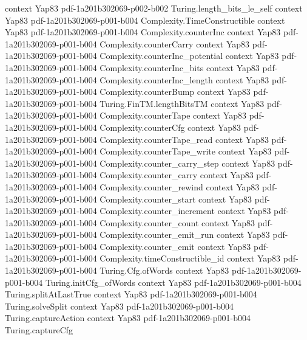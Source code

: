\begin{theorem}
  {context}
  {Yap83}
  {pdf-1a201b302069-p002-b002}
\proofstep
  {Turing.length_bits_le_self}
  {context}
  {Yap83}
  {pdf-1a201b302069-p001-b004}
\proofstep
  {Complexity.TimeConstructible}
  {context}
  {Yap83}
  {pdf-1a201b302069-p001-b004}
\proofstep
  {Complexity.counterInc}
  {context}
  {Yap83}
  {pdf-1a201b302069-p001-b004}
\proofstep
  {Complexity.counterCarry}
  {context}
  {Yap83}
  {pdf-1a201b302069-p001-b004}
\proofstep
  {Complexity.counterInc_potential}
  {context}
  {Yap83}
  {pdf-1a201b302069-p001-b004}
\proofstep
  {Complexity.counterInc_bits}
  {context}
  {Yap83}
  {pdf-1a201b302069-p001-b004}
\proofstep
  {Complexity.counterInc_length}
  {context}
  {Yap83}
  {pdf-1a201b302069-p001-b004}
\proofstep
  {Complexity.counterBump}
  {context}
  {Yap83}
  {pdf-1a201b302069-p001-b004}
\proofstep
  {Turing.FinTM.lengthBitsTM}
  {context}
  {Yap83}
  {pdf-1a201b302069-p001-b004}
\proofstep
  {Complexity.counterTape}
  {context}
  {Yap83}
  {pdf-1a201b302069-p001-b004}
\proofstep
  {Complexity.counterCfg}
  {context}
  {Yap83}
  {pdf-1a201b302069-p001-b004}
\proofstep
  {Complexity.counterTape_read}
  {context}
  {Yap83}
  {pdf-1a201b302069-p001-b004}
\proofstep
  {Complexity.counterTape_write}
  {context}
  {Yap83}
  {pdf-1a201b302069-p001-b004}
\proofstep
  {Complexity.counter_carry_step}
  {context}
  {Yap83}
  {pdf-1a201b302069-p001-b004}
\proofstep
  {Complexity.counter_carry}
  {context}
  {Yap83}
  {pdf-1a201b302069-p001-b004}
\proofstep
  {Complexity.counter_rewind}
  {context}
  {Yap83}
  {pdf-1a201b302069-p001-b004}
\proofstep
  {Complexity.counter_start}
  {context}
  {Yap83}
  {pdf-1a201b302069-p001-b004}
\proofstep
  {Complexity.counter_increment}
  {context}
  {Yap83}
  {pdf-1a201b302069-p001-b004}
\proofstep
  {Complexity.counter_count}
  {context}
  {Yap83}
  {pdf-1a201b302069-p001-b004}
\proofstep
  {Complexity.counter_emit_run}
  {context}
  {Yap83}
  {pdf-1a201b302069-p001-b004}
\proofstep
  {Complexity.counter_emit}
  {context}
  {Yap83}
  {pdf-1a201b302069-p001-b004}
\proofstep
  {Complexity.timeConstructible_id}
  {context}
  {Yap83}
  {pdf-1a201b302069-p001-b004}
\proofstep
  {Turing.Cfg.ofWords}
  {context}
  {Yap83}
  {pdf-1a201b302069-p001-b004}
\proofstep
  {Turing.initCfg_ofWords}
  {context}
  {Yap83}
  {pdf-1a201b302069-p001-b004}
\proofstep
  {Turing.splitAtLastTrue}
  {context}
  {Yap83}
  {pdf-1a201b302069-p001-b004}
\proofstep
  {Turing.solveSplit}
  {context}
  {Yap83}
  {pdf-1a201b302069-p001-b004}
\proofstep
  {Turing.captureAction}
  {context}
  {Yap83}
  {pdf-1a201b302069-p001-b004}
\proofstep
  {Turing.captureCfg}

\end{theorem}
